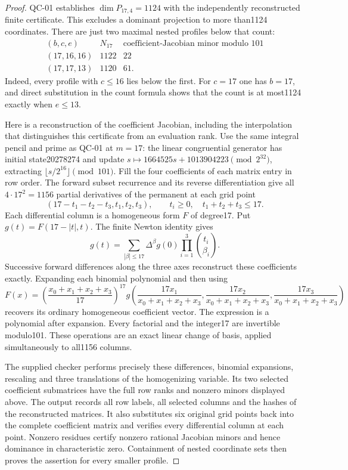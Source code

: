 \begin{proof}
QC-01 establishes $\dim P_{17,4}=1124$ with the independently
reconstructed finite certificate. This excludes a dominant projection
to more than1124 coordinates. There are just two maximal nested
profiles below that count:
\[
\begin{array}{c|r|r}
(b,c,e)&N_{17}&\text{coefficient-Jacobian minor modulo }101\\\hline
(17,16,16)&1122&22\\
(17,17,13)&1120&61.
\end{array}
\]
Indeed, every profile with $c\le16$ lies below the first. For $c=17$
one has $b=17$, and direct substitution in the count formula shows that
the count is at most1124 exactly when $e\le13$.

Here is a reconstruction of the coefficient Jacobian, including the
interpolation that distinguishes this certificate from an evaluation
rank. Use the same integral pencil and prime as QC-01 at $m=17$:
the linear congruential generator has initial state20278274 and update
$s\mapsto1664525s+1013904223\pmod{2^{32}}$, extracting
$\lfloor s/2^{16}\rfloor\pmod{101}$. Fill the four coefficients of
each matrix entry in row order. The forward subset recurrence and its
reverse differentiation give all $4\cdot17^2=1156$ partial derivatives
of the permanent at each grid point
\[
 (17-t_1-t_2-t_3,t_1,t_2,t_3),\qquad
 t_i\ge0,\quad t_1+t_2+t_3\le17.
\]
Each differential column is a homogeneous form $F$ of degree17.
Put $g(t)=F(17-|t|,t)$. The finite Newton identity gives
\[
 g(t)=\sum_{|\beta|\le17}
      \Delta^\beta g(0)\prod_{i=1}^{3}\binom{t_i}{\beta_i}.
\]
Successive forward differences along the three axes reconstruct these
coefficients exactly. Expanding each binomial polynomial and then using
\[
 F(x)=\left(\frac{x_0+x_1+x_2+x_3}{17}\right)^{17}
  g\left(\frac{17x_1}{x_0+x_1+x_2+x_3},
         \frac{17x_2}{x_0+x_1+x_2+x_3},
         \frac{17x_3}{x_0+x_1+x_2+x_3}\right)
\]
recovers its ordinary homogeneous coefficient vector. The expression is
a polynomial after expansion. Every factorial and the integer17 are
invertible modulo101. These operations are an exact linear change of
basis, applied simultaneously to all1156 columns.

The supplied checker performs precisely these differences, binomial
expansions, rescaling and three translations of the homogenizing
variable. Its two selected coefficient submatrices have the full row
ranks and nonzero minors displayed above. The output records all row
labels, all selected columns and the hashes of the reconstructed matrices.
It also substitutes six original grid points back into the complete
coefficient matrix and verifies every differential column at each point.
Nonzero residues certify nonzero rational Jacobian minors and hence
dominance in characteristic zero. Containment of nested coordinate sets
then proves the assertion for every smaller profile.


\end{proof}
